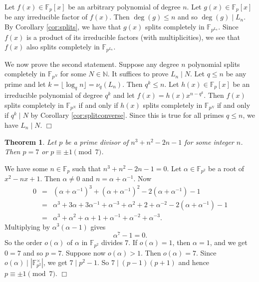 \documentclass{article}
\def\F{{\mathbb F}}
\def\N{{\mathbb N}}
\def\F{{\mathbb F}}
\newtheorem{theorem}[subsection]{Theorem}
\newenvironment{proof}{\noindent {\bf Proof:}}{$\Box$ \vspace{2 ex}}
\begin{document}
\begin{proof}
    Let $f(x)\in\F_p[x]$ be an arbitrary polynomial of degree $n$. Let $g(x)\in\F_p[x]$ be any irreducible factor of $f(x)$. Then $\deg(g)\leq n$ and so $\deg(g)\mid L_n$. By Corollary \ref{cor:splits}, we have that $g(x)$ splits completely in $\F_{p^{L_n}}$. Since $f(x)$ is a product of its irreducible factors (with multiplicities), we see that $f(x)$ also splits completely in $\F_{p^{L_n}}.$

    We now prove the second statement. Suppose any degree $n$ polynomial splits completely in $\F_{p^N}$ for some $N\in\N$. It suffices to prove $L_n\mid N$. Let $q\leq n$ be any prime and let $k = \lfloor \log_q n\rfloor = \nu_q(L_n)$. Then $q^k\leq n$. Let $h(x)\in\F_p[x]$ be an irreducible polynomial of degree $q^k$ and let $f(x) = h(x)x^{n - q^k}$. Then $f(x)$ splits completely in $\F_{p^N}$ if and only if $h(x)$ splits completely in $\F_{p^N}$ if and only if $q^k\mid N$ by Corollary \ref{cor:splitconverse}. Since this is true for all primes $q\leq n$, we have $L_n\mid N$.
\end{proof}


\begin{theorem}\label{thm:p7}
    Let $p$ be a prime divisor of $n^3 + n^2 - 2n - 1$ for some integer $n$. Then $p = 7$ or $p\equiv \pm1\pmod{7}$.
\end{theorem}

\begin{proof}
    We have some $n\in\F_p$ such that $n^3 + n^2 - 2n - 1 = 0$. Let $\alpha\in\F_{p^2}$ be a root of $x^2 - nx + 1.$ Then $\alpha\neq 0$ and $n = \alpha + \alpha^{-1}$. Now
    \begin{eqnarray*}
        0 &=& (\alpha + \alpha^{-1})^3 + (\alpha + \alpha^{-1})^2 - 2(\alpha + \alpha^{-1}) - 1\\
        &=& \alpha^3 + 3\alpha + 3\alpha^{-1} + \alpha^{-3} + \alpha^2 + 2 + \alpha^{-2} - 2(\alpha + \alpha^{-1}) - 1\\
        &=& \alpha^3 + \alpha^2 + \alpha + 1 + \alpha^{-1} + \alpha^{-2} + \alpha^{-3}.
    \end{eqnarray*}
    Multiplying by $\alpha^3(\alpha-1)$ gives $$\alpha^7 - 1 = 0.$$
    So the order $o(\alpha)$ of $\alpha$ in $\F_{p^2}$ divides $7$. If $o(\alpha) = 1$, then $\alpha = 1$, and we get $0 = 7$ and so $p = 7$. Suppose now $o(\alpha) > 1$. Then $o(\alpha) = 7$. Since $o(\alpha)\mid|\F_{p^2}^\times|$, we get $7\mid p^2 - 1.$ So $7\mid (p-1)(p+1)$ and hence $p\equiv \pm1\pmod{7}$. 
\end{proof}
\end{document}
